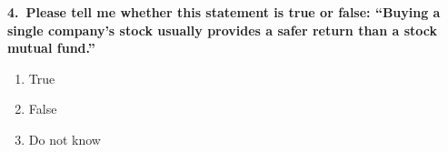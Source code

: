 \documentclass[letterpaper,10pt]{article}
\begin{document}
\vspace{1.5cm}

\textbf{4.\ Please tell me whether this statement is true or false: ``Buying a single company's stock usually provides a safer return than a stock mutual fund.''}

\vspace{0.3em}
\begin{enumerate}[label=\alph*)]
  \item True
  \item False
  \item Do not know
\end{enumerate}
\end{document}

